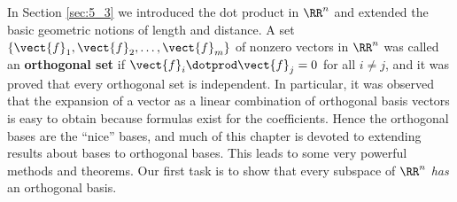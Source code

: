 \noindent In Section \ref{sec:5_3} we introduced the dot product in $\RR^n$ and extended the basic geometric notions of length and distance. A set $\{ \vect{f}_1, \vect{f}_2, \dots, \vect{f}_m\}$ of nonzero vectors in $\RR^n$ was called an \textbf{orthogonal set} if $\vect{f}_i \dotprod \vect{f}_j =0$ for all $i \neq j$, and it was proved that every orthogonal set is independent. In particular, it was observed that the expansion of a vector as a linear combination of orthogonal basis vectors is easy to obtain because formulas exist for the coefficients. Hence the orthogonal bases are the ``nice'' bases, and much of this chapter is devoted to extending results about bases to orthogonal bases. This leads to some very powerful methods and theorems. Our first task is to show that every subspace of $\RR^n$ \textit{has} an orthogonal basis. 
